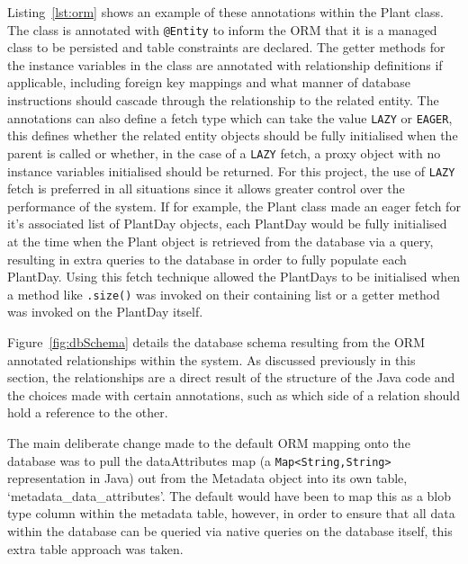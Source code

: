  Listing~\ref{lst:orm} shows an example of these annotations within the Plant class. The class is annotated with \texttt{@Entity} to inform the ORM that it is a managed class to be persisted and table constraints are declared. The getter methods for the instance variables in the class are annotated with relationship definitions if applicable, including foreign key mappings and what manner of database instructions should cascade through the relationship to the related entity. The annotations can also define a fetch type which can take the value \texttt{LAZY} or \texttt{EAGER}, this defines whether the related entity objects should be fully initialised when the parent is called or whether, in the case of a \texttt{LAZY} fetch, a proxy object with no instance variables initialised should be returned. For this project, the use of \texttt{LAZY} fetch is preferred in all situations since it allows greater control over the performance of the system. If for example, the Plant class made an eager fetch for it's associated list of PlantDay objects, each PlantDay would be fully initialised at the time when the Plant object is retrieved from the database via a query, resulting in extra queries to the database in order to fully populate each PlantDay. Using this fetch technique allowed the PlantDays to be initialised when a method like \texttt{.size()} was invoked on their containing list or a getter method was invoked on the PlantDay itself. 

\lstjava


Figure~\ref{fig:dbSchema} details the database schema resulting from the ORM annotated relationships within the system. As discussed previously in this section, the relationships are a direct result of the structure of the Java code and the choices made with certain annotations, such as which side of a relation should hold a reference to the other.

 The main deliberate change made to the default ORM mapping onto the database was to pull the dataAttributes map (a \texttt{Map<String,String>} representation in Java) out from the Metadata object into its own table, `metadata\_data\_attributes'. The default would have been to map this as a blob type column within the metadata table, however, in order to ensure that all data within the database can be queried via native queries on the database itself, this extra table approach was taken.



